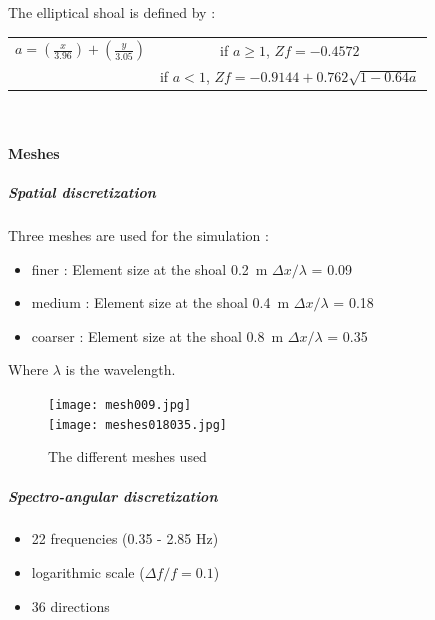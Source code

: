\vspace{1cm}

The elliptical shoal is defined by :\\
\begin{center}

\begin{tabular}{c|c}
$a = (\frac{x}{3.96})+(\frac{y}{3.05})$ & if $a \geq 1$, $Zf = -0.4572$\\
 & if $a < 1$, $Zf = -0.9144+0.762 \sqrt{1-0.64a}$
\end{tabular}\\
\end{center}
\paragraph{Meshes}
\subparagraph{Spatial discretization}
Three meshes are used for the simulation :
\begin{itemize}
\item finer : Element size at the shoal 0.2~m \quad $\Delta x/\lambda$ = 0.09
\item medium : Element size at the shoal 0.4~m \quad $\Delta x/\lambda$ = 0.18
\item coarser : Element size at the shoal 0.8~m \quad $\Delta x/\lambda$ = 0.35
\end{itemize}

Where $\lambda$ is the wavelength.
\begin{figure}[h!]
  \centering
    \texttt{[image: mesh009.jpg]}\\
    \texttt{[image: meshes018035.jpg]}
      \caption{The different meshes used}
\label{meshshoal}
\end{figure}

\subparagraph{Spectro-angular discretization}
\begin{itemize}
\item 22 frequencies (0.35 - 2.85 Hz)
\item logarithmic scale ($\Delta f/f = 0.1$)
\item 36 directions
\end{itemize}

